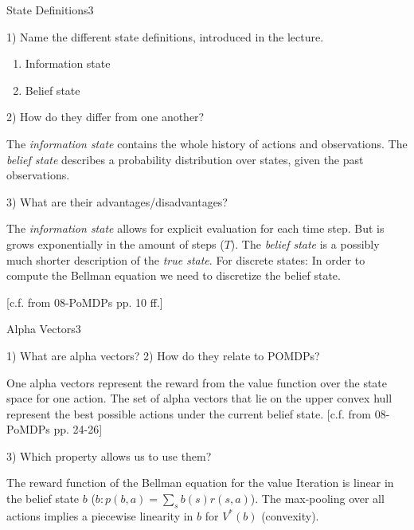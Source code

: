\begin{questions}
\begin{question}{State Definitions}{3}
	
	1) Name the different state definitions, introduced in the lecture.
\begin{answer}
	
	\begin{enumerate}
		\item Information state
		\item Belief state
	\end{enumerate}

\end{answer}
	
	2) How do they differ from one another?
\begin{answer}
	
	The \textit{information state} contains the whole history of actions and observations.
	The \textit{belief state} describes a probability distribution over states, given the past observations.
\end{answer}
	
	3) What are their advantages/disadvantages?
\begin{answer}
	
	The \textit{information state} allows for explicit evaluation for each time step. But is grows exponentially in the amount of steps ($T$).
	The \textit{belief state} is a possibly much shorter description of the \textit{true state}. For discrete states: In order to compute the Bellman equation we need to discretize the belief state.
\end{answer}
[c.f. from 08-PoMDPs pp. 10 ff.]
\end{question}


\begin{question}{Alpha Vectors}{3}
	
	1) What are alpha vectors?
	2) How do they relate to POMDPs?
	\begin{answer}
		
		One alpha vectors represent the reward from the value function over the state space for one action.
		The set of alpha vectors that lie on the upper convex hull represent the best possible actions under the current belief state.
		[c.f. from 08-PoMDPs pp. 24-26]
	\end{answer}
	
	3) Which property allows us to use them?
	\begin{answer}
		
		The reward function of the Bellman equation for the value Iteration is linear in the belief state $b$ ($b: p(b,a) = \sum_s b(s)r(s,a)$). The max-pooling over all actions implies a piecewise linearity in $b$ for $V^*(b)$ (convexity).
	\end{answer}
\end{question}



\end{questions}
